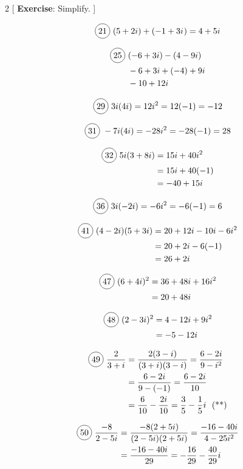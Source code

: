 \begin{multicols}{2}
[
  \textbf{Exercise}: Simplify.
]

\begin{align*}
  \circled{21}\ (5+2i)+(-1+3\iu)=4+5i
\end{align*}

  \begin{align*}
    \circled{25}\ &(-6+3i)-(4-9i)\\
    &-6+3i+(-4)+9i\\
    &-10 +12i
  \end{align*}

  \[\circled{29}\ 3i(4i)=12i^{2}=12(-1)=-12\]

  \[\circled{31}\ -7i(4i)=-28i^{2}=-28(-1)=28\]

  \begin{align*}
    \circled{32}\ 5i(3+8i)&=15i+40i^{2}\\
    &=15i+40(-1)\\
    &=-40+15i
  \end{align*}

  \[\circled{36}\ 3i(-2i)=-6i^{2}=-6(-1)=6\]

  \begin{align*}
    \circled{41}\ (4-2i)(5+3i)&=20+12i-10i-6i^{2}\\
    &=20+2i-6(-1)\\
    &=26+2i
  \end{align*}

  \begin{align*}
    \circled{47}\ (6+4i)^{2}&=36+48i+16i^{2}\\
    &=20+48i\\
  \end{align*}

  \begin{align*}
    \circled{48}\ (2-3i)^{2}&=4-12i+9i^{2}\\
    &=-5-12i\\
  \end{align*}

  \begin{align*}
    \circled{49}\ \frac{2}{3+i}&=\frac{2(3-i)}{(3+i)(3-i)}=\frac{6-2i}{9-i^{2}}\\
    &=\frac{6-2i}{9-(-1)}=\frac{6-2i}{10}\\
    &=\frac{6}{10}-\frac{2i}{10}=\frac{3}{5}-\frac{1}{5}i\ \text{ (**)}
  \end{align*}

  \begin{align*}
    \circled{50}\ \frac{-8}{2-5i}&=\frac{-8(2+5i)}{(2-5i)(2+5i)}=\frac{-16-40i}{4-25i^{2}}\\
    &=\frac{-16-40i}{29}=-\frac{16}{29}-\frac{40}{29}i\\
  \end{align*}


\end{multicols}
